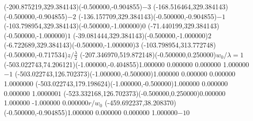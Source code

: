 \color{ASYcolor}
\fontsize{12.000000}{14.400000}\selectfont
\ASYalign(-200.875219,329.384143)(-0.500000,-0.904855){\vphantom{$10^4$}$-3$}
\color{ASYcolor}
\fontsize{12.000000}{14.400000}\selectfont
\ASYalign(-168.516464,329.384143)(-0.500000,-0.904855){\vphantom{$10^4$}$-2$}
\color{ASYcolor}
\fontsize{12.000000}{14.400000}\selectfont
\ASYalign(-136.157709,329.384143)(-0.500000,-0.904855){\vphantom{$10^4$}$-1$}
\color{ASYcolor}
\fontsize{12.000000}{14.400000}\selectfont
\ASYalign(-103.798954,329.384143)(-0.500000,-1.000000){\vphantom{$10^4$}$0$}
\color{ASYcolor}
\fontsize{12.000000}{14.400000}\selectfont
\ASYalign(-71.440199,329.384143)(-0.500000,-1.000000){\vphantom{$10^4$}$1$}
\color{ASYcolor}
\fontsize{12.000000}{14.400000}\selectfont
\ASYalign(-39.081444,329.384143)(-0.500000,-1.000000){\vphantom{$10^4$}$2$}
\color{ASYcolor}
\fontsize{12.000000}{14.400000}\selectfont
\ASYalign(-6.722689,329.384143)(-0.500000,-1.000000){\vphantom{$10^4$}$3$}
\color{ASYcolor}
\fontsize{12.000000}{14.400000}\selectfont
\ASYalign(-103.798954,313.772748)(-0.500000,-0.717534){{\Large $z/\frac{\lambda}{2}$}}
\color{ASYcolor}
\fontsize{12.000000}{14.400000}\selectfont
\ASYalign(-207.346970,519.872148)(-0.500000,0.250000){{\LARGE $w_0/\lambda=1$}}
\color{ASYcolor}
\fontsize{12.000000}{14.400000}\selectfont
\ASYalignT(-503.022743,74.206121)(-1.000000,-0.404855){1.000000 0.000000 0.000000 1.000000}{\vphantom{$10^4$}$-1$}
\color{ASYcolor}
\fontsize{12.000000}{14.400000}\selectfont
\ASYalignT(-503.022743,126.702373)(-1.000000,-0.500000){1.000000 0.000000 0.000000 1.000000}{\vphantom{$10^4$}$0$}
\color{ASYcolor}
\fontsize{12.000000}{14.400000}\selectfont
\ASYalignT(-503.022743,179.198624)(-1.000000,-0.500000){1.000000 0.000000 0.000000 1.000000}{\vphantom{$10^4$}$1$}
\color{ASYcolor}
\fontsize{12.000000}{14.400000}\selectfont
\ASYalignT(-523.332168,126.702373)(-0.500000,0.250000){0.000000 1.000000 -1.000000 0.000000}{{\Large $r/w_0$}}
\color{ASYcolor}
\fontsize{12.000000}{14.400000}\selectfont
\ASYalignT(-459.692237,38.208370)(-0.500000,-0.904855){1.000000 0.000000 0.000000 1.000000}{\vphantom{$10^4$}$-10$}
